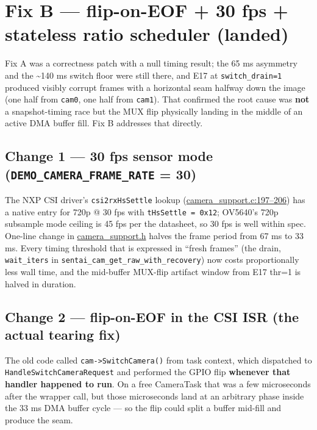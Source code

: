\section{Fix B --- flip-on-EOF + 30 fps + stateless ratio scheduler
(landed)}\label{fix-b-flip-on-eof-30-fps-stateless-ratio-scheduler-landed}

Fix A was a correctness patch with a null timing result; the 65 ms
asymmetry and the \textasciitilde140 ms switch floor were still there,
and E17 at \texttt{switch\_drain=1} produced visibly corrupt frames with
a horizontal seam halfway down the image (one half from \texttt{cam0},
one half from \texttt{cam1}). That confirmed the root cause was
\textbf{not} a snapshot-timing race but the MUX flip physically landing
in the middle of an active DMA buffer fill. Fix B addresses that
directly.

\subsection{\texorpdfstring{Change 1 --- 30 fps sensor mode
(\texttt{DEMO\_CAMERA\_FRAME\_RATE} =
30)}{Change 1 --- 30 fps sensor mode (DEMO\_CAMERA\_FRAME\_RATE = 30)}}\label{change-1-30-fps-sensor-mode-demo_camera_frame_rate-30}

The NXP CSI driver's \texttt{csi2rxHsSettle} lookup
(\href{../../../libs/camera/camera_support.c\#L197}{camera\_support.c:197--206})
has a native entry for 720p @ 30 fps with \texttt{tHsSettle\ =\ 0x12};
OV5640's 720p subsample mode ceiling is 45 fps per the datasheet, so 30
fps is well within spec. One-line change in
\href{../../../libs/camera/camera_support.h}{camera\_support.h} halves
the frame period from 67 ms to 33 ms. Every timing threshold that is
expressed in ``fresh frames'' (the drain, \texttt{wait\_iters} in
\texttt{sentai\_cam\_get\_raw\_with\_recovery}) now costs proportionally
less wall time, and the mid-buffer MUX-flip artifact window from E17
thr=1 is halved in duration.

\subsection{Change 2 --- flip-on-EOF in the CSI ISR (the actual tearing
fix)}\label{change-2-flip-on-eof-in-the-csi-isr-the-actual-tearing-fix}

The old code called \texttt{cam-\textgreater{}SwitchCamera()} from task
context, which dispatched to \texttt{HandleSwitchCameraRequest} and
performed the GPIO flip \textbf{whenever that handler happened to run}.
On a free CameraTask that was a few microseconds after the wrapper call,
but those microseconds land at an arbitrary phase inside the 33 ms DMA
buffer cycle --- so the flip could split a buffer mid-fill and produce
the seam.

